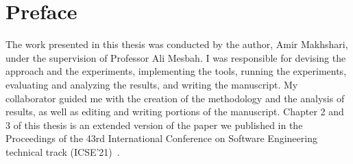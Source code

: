 
\chapter{Preface}

The work presented in this thesis was conducted by the author, Amir Makhshari, under the supervision of Professor Ali Mesbah. I was responsible for devising the approach and the experiments, implementing the tools, running the experiments, evaluating and analyzing the results, and writing the manuscript. My collaborator guided me with the creation of the methodology and the analysis of results, as well as editing and writing portions of the manuscript. Chapter 2 and 3 of this thesis is an extended version of the paper we published in the Proceedings of the 43rd International Conference on Software Engineering technical track (ICSE'21)~\cite{makhshari2021iot}.
